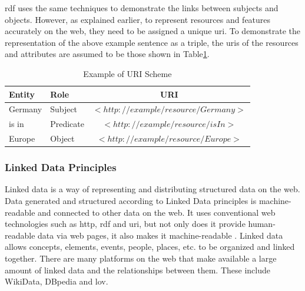     \acrshort{rdf} uses the same techniques to demonstrate the links between subjects and objects. However, as explained earlier, to represent resources and features accurately on the web, they need to be assigned a unique \acrshort{uri}. To demonstrate the representation of the above example sentence as a triple, the \acrshort{uri}s of the resources and attributes are assumed to be those shown in Table\ref{tab:rdf-example-uri}.
    
    \begin{table}[h]
        \centering
	    {
	    \begin{tabular}{ | m{2.5cm} | m{2.5cm} | c | }
            \hline
            \rowcolor{teal!30} Entity & Role & URI \\
            
            \hline
            Germany  & Subject & $<http://example/resource/Germany>$\\
            
            \hline
            is in  & Predicate & $<http://example/resource/isIn>$\\
            
            \hline
            Europe  & Object & $<http://example/resource/Europe>$\\
            
            \hline
        \end{tabular}}
        \caption{\label{tab:rdf-example-uri} Example of URI Scheme}
    \end{table}

    \subsubsection{Linked Data Principles}
    Linked data is a way of representing and distributing structured data on the web. Data generated and structured according to Linked Data principles is machine-readable and connected to other data on the web. It uses conventional web technologies such as \acrshort{http}, \acrshort{rdf} and \acrshort{uri}, but not only does it provide human-readable data via web pages, it also makes it machine-readable \cite{bizer2008linked}. Linked data allows concepts, elements, events, people, places, etc. to be organized and linked together. There are many platforms on the web that make available a large amount of linked data and the relationships between them. These include WikiData, DBpedia and \acrfull{lov}.\\

